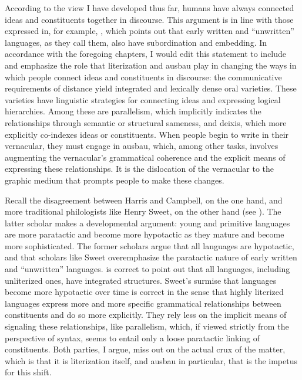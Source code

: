 According to the view I have developed thus far, humans have always connected ideas and constituents together in discourse. This argument is in line with those expressed in, for example, \citet[308--310]{HarrisCampbell1995}, which points out that early written and “unwritten” languages, as they call them, also have subordination and embedding. In accordance with the foregoing chapters, I would edit this statement to include and emphasize the role that literization and ausbau play in changing the ways in which people connect ideas and constituents in discourse: the communicative requirements of distance yield integrated and lexically dense oral varieties. These varieties have linguistic strategies for connecting ideas and expressing logical hierarchies. Among these are parallelism, which implicitly indicates the relationships through semantic or structural sameness, and deixis, which more explicitly co-indexes ideas or constituents. When people begin to write in their vernacular, they must engage in ausbau, which, among other tasks, involves augmenting the vernacular’s grammatical coherence and the explicit means of expressing these relationships. It is the dislocation of the vernacular to the graphic medium that prompts people to make these changes.

\begin{sloppypar}
Recall the disagreement between Harris and Campbell, on the one hand, and more traditional philologists like Henry Sweet, on the other hand (see ). The latter scholar makes a developmental argument: young and primitive languages are more paratactic and become more hypotactic as they mature and become more sophisticated. The former scholars argue that all languages are hypotactic, and that scholars like Sweet overemphasize the paratactic nature of early written and “unwritten” languages. \citet{HarrisCampbell1995} is correct to point out that all languages, including unliterized ones, have integrated structures. Sweet’s surmise that languages become more hypotactic over time is correct in the sense that highly literized languages express more and more specific grammatical relationships between constituents and do so more explicitly. They rely less on the implicit means of signaling these relationships, like parallelism, which, if viewed strictly from the perspective of syntax, seems to entail only a loose paratactic linking of constituents. Both parties, I argue, miss out on the actual crux of the matter, which is that it is literization itself, and ausbau in particular, that is the impetus for this shift.
\end{sloppypar}

